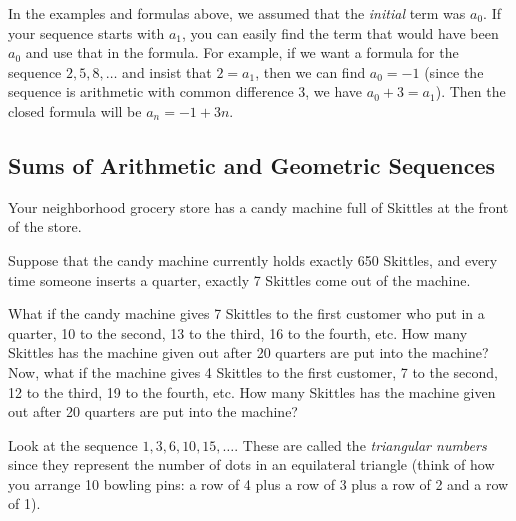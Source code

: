 \documentclass[12pt]{article}
\begin{document}
In the examples and formulas above, we assumed that the \emph{initial} term was $a_0$.  If your sequence starts with $a_1$, you can easily find the term that would have been $a_0$ and use that in the formula.  For example, if we want a formula for the sequence $2, 5, 8,\ldots$ and insist that $2= a_1$, then we can find $a_0 = -1$ (since the sequence is arithmetic with common difference 3, we have $a_0 + 3 = a_1$).  Then the closed formula will be $a_n = -1 + 3n$.



\subsection{Sums of Arithmetic and Geometric Sequences}

\begin{activity}
Your neighborhood grocery store has a candy machine full of Skittles at the front of the store.
\begin{questions}
\question Suppose that the candy machine currently holds exactly 650 Skittles, and every time someone inserts a quarter, exactly 7 Skittles come out of the machine. 
\question What if the candy machine gives 7 Skittles to the first customer who put in a quarter, 10 to the second, 13 to the third, 16 to the fourth, etc. How many Skittles has the machine given out after 20 quarters are put into the machine?
\question Now, what if the machine gives 4 Skittles to the first customer, 7 to the second, 12 to the third, 19 to the fourth, etc. How many Skittles has the machine given out after 20 quarters are put into the machine?
\end{questions}
\end{activity}



Look at the sequence $1, 3, 6, 10, 15,\ldots$.  These are called the \emph{triangular numbers} since they represent the number of dots in an equilateral triangle (think of how you arrange 10 bowling pins: a row of 4 plus a row of 3 plus a row of 2 and a row of 1).  
\end{document}
